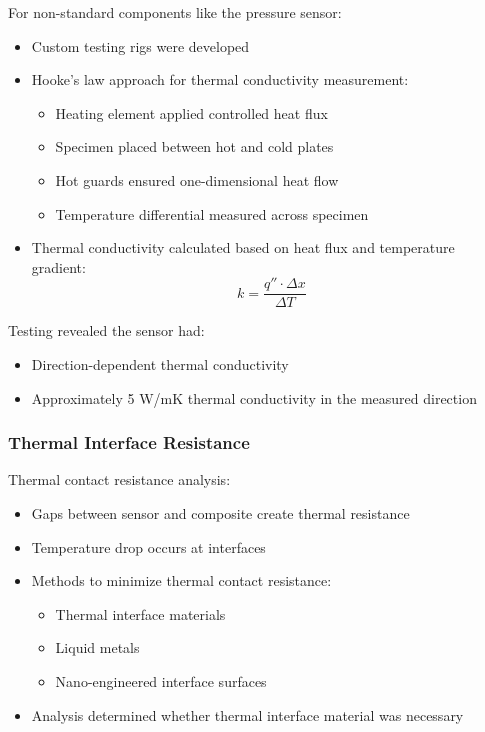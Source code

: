 For non-standard components like the pressure sensor:
\begin{itemize}
    \item Custom testing rigs were developed
    \item Hooke's law approach for thermal conductivity measurement:
    \begin{itemize}
        \item Heating element applied controlled heat flux
        \item Specimen placed between hot and cold plates
        \item Hot guards ensured one-dimensional heat flow
        \item Temperature differential measured across specimen
    \end{itemize}
    \item Thermal conductivity calculated based on heat flux and temperature gradient:
    \[
    k = \frac{q'' \cdot \Delta x}{\Delta T}
    \]
\end{itemize}

Testing revealed the sensor had:
\begin{itemize}
    \item Direction-dependent thermal conductivity
    \item Approximately 5 W/mK thermal conductivity in the measured direction
\end{itemize}

\subsubsection*{Thermal Interface Resistance}

Thermal contact resistance analysis:
\begin{itemize}
    \item Gaps between sensor and composite create thermal resistance
    \item Temperature drop occurs at interfaces
    \item Methods to minimize thermal contact resistance:
    \begin{itemize}
        \item Thermal interface materials
        \item Liquid metals
        \item Nano-engineered interface surfaces
    \end{itemize}
    \item Analysis determined whether thermal interface material was necessary
\end{itemize}

